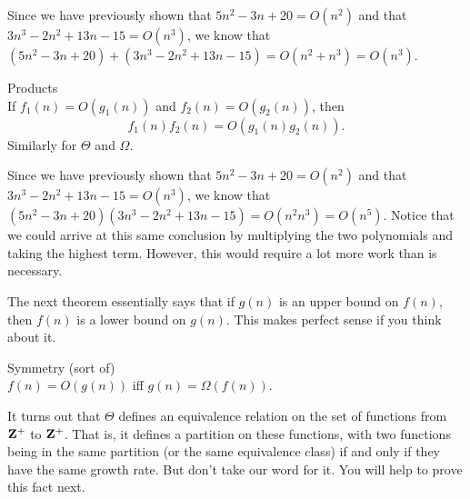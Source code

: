 \begin{exa}
Since we have previously shown that $5n^2-3n+20=O(n^2)$ and that $3n^3-2n^2+13n-15=O(n^3)$,
we know that $(5n^2-3n+20) +(3n^3-2n^2+13n-15)=O(n^2+n^3)=O(n^3)$.
\end{exa}

\begin{thm}\label{thm:asyprops3b}
Products\\
 If $f_{1}(n) = O(g_{1}(n))$ and $f_{2}(n) = O(g_{2}(n))$,
then 
$$f_{1}(n)f_{2}(n) = O(g_{1}(n)g_{2}(n)).$$
Similarly for $\Theta$ and $\Omega$.
\end{thm}

\begin{exa}
Since we have previously shown that $5n^2-3n+20=O(n^2)$ and that $3n^3-2n^2+13n-15=O(n^3)$,
we know that $(5n^2-3n+20)(3n^3-2n^2+13n-15)=O(n^2n^3)=O(n^5)$.  
Notice that we could arrive at this same conclusion by multiplying the two polynomials
and taking the highest term.  However, this would require a lot more work than is necessary.
\end{exa}


The next theorem essentially says that if $g(n)$ is an upper bound on $f(n)$, then
$f(n)$ is a lower bound on $g(n)$.  This makes perfect sense if you think about it.

\begin{thm}\label{thm:asyprops4}
Symmetry (sort of)\\
 $f(n)=O(g(n))$ iff $g(n)=\Omega(f(n))$.
\end{thm}


It turns out that $\Theta$ defines an equivalence relation on the set of functions
from ${\bf Z}^{+}$ to ${\bf Z}^{+}$. That is, it defines a partition on these functions,
with two functions being in the same partition (or the same equivalence class)
if and only if they have the same growth rate.
But don't take our word for it.  You will help to prove this fact next.


